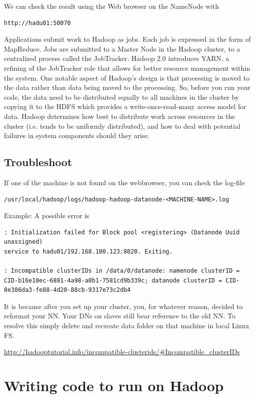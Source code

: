 We can check the result using the Web browser on the NameNode with
\begin{verbatim}
http://hadu01:50070
\end{verbatim}

Applications submit work to Hadoop as jobs. Each job is expressed in the form of
MapReduce. Jobs are submitted to a Master Node in the Hadoop cluster, to a
centralized process called the JobTracker. Hadoop 2.0 introduces YARN, a
refining of the JobTracker role that allows for better resource management
within the system.
One notable aspect of Hadoop's design is that processing is moved to the data
rather than data being moved to the processing. So, before you run your code,
the data need to be distributed equally to all machines in the cluster by
copying it to the HDFS which provides a write-once-read-many access model for
data.
Hadoop determines how best to distribute work across resources in the cluster (i.e.
tends to be uniformly distributed), and how to deal with potential failures in
system components should they arise. 


\subsection{Troubleshoot}
\label{sec:Troubleshoot_incompatible_clusterID}

If one of the machine is not found on the webbrowser, you can check the log-file
\begin{verbatim}
/usr/local/hadoop/logs/hadoop-hadoop-datanode-<MACHINE-NAME>.log
\end{verbatim}

Example: A possible error is
\begin{verbatim}
: Initialization failed for Block pool <registering> (Datanode Uuid unassigned)
service to hadu01/192.168.100.123:8020. Exiting.

: Incompatible clusterIDs in /data/0/datanode: namenode clusterID =
CID-b16e10ec-6881-4a98-a0b1-7581cd9b339c; datanode clusterID = CID-8e386da3-fe88-4d20-88cb-9317e73c2db4
\end{verbatim}
It is because after you set up your cluster, you, for whatever reason, decided
to reformat your NN. Your DNs on slaves still bear reference to the old NN.
To resolve this simply delete and recreate data folder on that machine in local
Linux FS.

\url{http://hadooptutorial.info/incompatible-clusterids/\#Incompatible_clusterIDs}


\section{Writing code to run on Hadoop}

